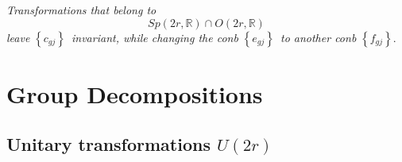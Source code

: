 \documentclass[aps,preprint]{revtex4}
\begin{document}
\emph{Transformations that belong to }%
\begin{equation}
Sp\left( 2r,\mathbb{R}\right) \cap O\left( 2r,\mathbb{R}\right)
\end{equation}
\emph{leave }$\left\{ c_{gj}\right\} $\emph{\ invariant, while changing the
conb }$\left\{ e_{gj}\right\} $\emph{\ to another conb }$\left\{
f_{gj}\right\} .$

\section{Group Decompositions}

\subsection{Unitary transformations $U\left( 2r\right) $}
\end{document}
